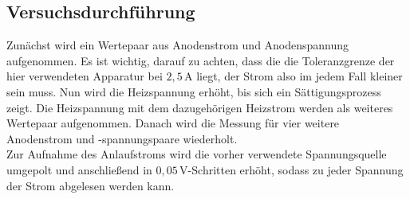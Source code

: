 \subsection{Versuchsdurchführung}

Zunächst wird ein Wertepaar aus Anodenstrom und Anodenspannung aufgenommen.
Es ist wichtig, darauf zu achten, dass die die Toleranzgrenze der hier verwendeten Apparatur bei $2,5 \,\unit{\ampere}$ liegt, der Strom also im jedem Fall kleiner sein muss.
Nun wird die Heizspannung erhöht, bis sich ein Sättigungsprozess zeigt.
Die Heizspannung mit dem dazugehörigen Heizstrom werden als weiteres Wertepaar aufgenommen.
Danach wird die Messung für vier weitere Anodenstrom und -spannungspaare wiederholt. \\

Zur Aufnahme des Anlaufstroms wird die vorher verwendete Spannungsquelle umgepolt und anschließend in $0,05 \,\unit{\volt}$-Schritten erhöht, sodass zu jeder Spannung der Strom abgelesen werden kann.
